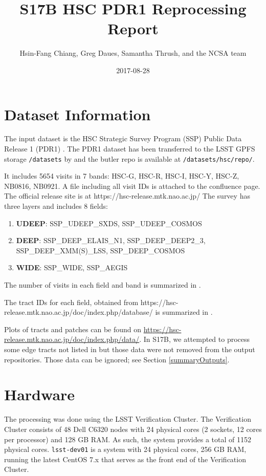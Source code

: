 \documentclass[DM,authoryear,toc]{lsstdoc}
\title{S17B HSC PDR1 Reprocessing Report}
\author{%
Hsin-Fang Chiang, Greg Daues, Samantha Thrush, and the NCSA team
}
\date{2017-08-28}
\begin{document}
\maketitle

\section{Dataset Information}
The input dataset is the HSC Strategic Survey Program (SSP) Public Data Release 1 (PDR1) \citep{2017arXiv170208449A}.
The PDR1 dataset has been transferred to the LSST GPFS storage \texttt{/datasets} by  and the butler repo is available at \texttt{/datasets/hsc/repo/}.

It includes 5654 visits in 7 bands: HSC-G, HSC-R, HSC-I, HSC-Y, HSC-Z, NB0816, NB0921. A file including all visit IDs is attached to the confluence page.  The official release site is at https://hsc-release.mtk.nao.ac.jp/
The survey has three layers and includes 8 fields:
\begin{enumerate}
\item
\textbf{UDEEP}: SSP{\_}UDEEP{\_}SXDS, SSP{\_}UDEEP{\_}COSMOS
\item
\textbf{DEEP}: SSP{\_}DEEP{\_}ELAIS{\_}N1, SSP{\_}DEEP{\_}DEEP2{\_}3, SSP{\_}DEEP{\_}XMM(S){\_}LSS, SSP{\_}DEEP{\_}COSMOS
\item
\textbf{WIDE}: SSP{\_}WIDE, SSP{\_}AEGIS
\end{enumerate}

The number of visits in each field and band is summarized in .



The tract IDs for each field, obtained
from https://hsc-release.mtk.nao.ac.jp/doc/index.php/database/
is summarized in .



Plots of tracts and patches can be found on  \url{https://hsc-release.mtk.nao.ac.jp/doc/index.php/data/}.
In S17B, we attempted to process some edge tracts not listed in  but those data were not removed from the output repositories. Those data can be ignored; see Section \ref{summaryOutputs}.

\section{Hardware}
The processing was done using the LSST Verification Cluster.
The Verification Cluster consists of 48 Dell C6320 nodes with 24 physical cores (2 sockets, 12 cores per processor) and 128 GB RAM. As such, the system provides a total of 1152 physical cores.
\texttt{lsst-dev01} is a system with 24 physical cores, 256 GB RAM, running the latest CentOS 7.x that serves as the front end of the Verification Cluster.
\end{document}

